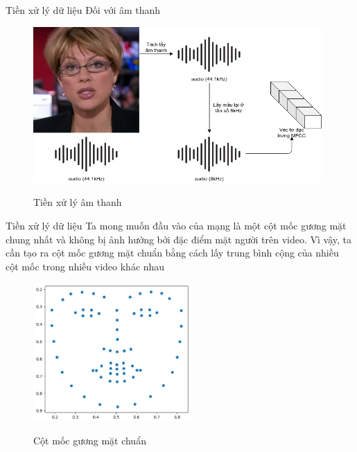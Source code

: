 \begin{frame}{Tiền xử lý dữ liệu}
    Đối với âm thanh
    \begin{figure}[H]
        \centering
        \includegraphics[width=11cm]{images/preprocess-audio.png}
        \label{fig:preprocess-audio}
        \caption{Tiền xử lý âm thanh}
    \end{figure}
\end{frame}

\begin{frame}{Tiền xử lý dữ liệu}
    Ta mong muốn đầu vào của mạng là một cột mốc gương mặt chung nhất và không bị ảnh hưởng bởi đặc điểm mặt người trên video. Vì vậy, ta cần tạo ra cột mốc gương mặt chuẩn bằng cách lấy trung bình cộng của nhiều cột mốc trong nhiều video khác nhau
    \begin{figure}[H]
        \centering
        \includegraphics[width=6cm]{images/standard_landmark.png}
        \label{fig:standard_landmark}
        \caption{Cột mốc gương mặt chuẩn}
    \end{figure}
\end{frame}

